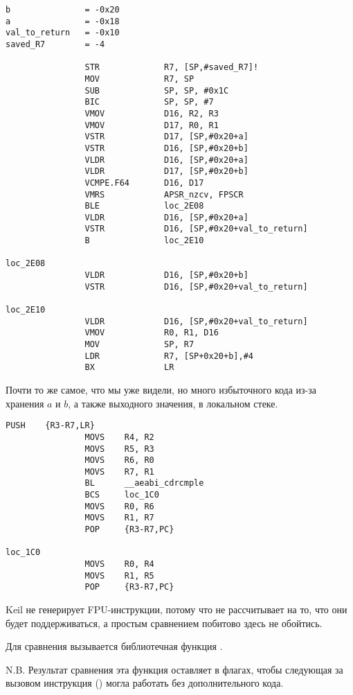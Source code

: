 \begin{lstlisting}[caption=\NonOptimizingXcodeIV (\ARMMode)]
b               = -0x20
a               = -0x18
val_to_return   = -0x10
saved_R7        = -4

                STR             R7, [SP,#saved_R7]!
                MOV             R7, SP
                SUB             SP, SP, #0x1C
                BIC             SP, SP, #7
                VMOV            D16, R2, R3
                VMOV            D17, R0, R1
                VSTR            D17, [SP,#0x20+a]
                VSTR            D16, [SP,#0x20+b]
                VLDR            D16, [SP,#0x20+a]
                VLDR            D17, [SP,#0x20+b]
                VCMPE.F64       D16, D17
                VMRS            APSR_nzcv, FPSCR
                BLE             loc_2E08
                VLDR            D16, [SP,#0x20+a]
                VSTR            D16, [SP,#0x20+val_to_return]
                B               loc_2E10

loc_2E08
                VLDR            D16, [SP,#0x20+b]
                VSTR            D16, [SP,#0x20+val_to_return]

loc_2E10
                VLDR            D16, [SP,#0x20+val_to_return]
                VMOV            R0, R1, D16
                MOV             SP, R7
                LDR             R7, [SP+0x20+b],#4
                BX              LR
\end{lstlisting}

Почти то же самое, что мы уже видели, 
но много избыточного кода из-за хранения $a$ и $b$, 
а также выходного значения, в локальном стеке.


\myparagraph{\OptimizingKeilVI (\ThumbMode)}

\begin{lstlisting}[caption=\OptimizingKeilVI (\ThumbMode)]
                PUSH    {R3-R7,LR}
                MOVS    R4, R2
                MOVS    R5, R3
                MOVS    R6, R0
                MOVS    R7, R1
                BL      __aeabi_cdrcmple
                BCS     loc_1C0
                MOVS    R0, R6
                MOVS    R1, R7
                POP     {R3-R7,PC}

loc_1C0
                MOVS    R0, R4
                MOVS    R1, R5
                POP     {R3-R7,PC}
\end{lstlisting}

Keil не генерирует FPU-инструкции, потому что не 
рассчитывает на то, что они будет поддерживаться, а простым сравнением побитово здесь не обойтись.

Для сравнения вызывается библиотечная функция . 

N.B. Результат сравнения эта функция оставляет в флагах, чтобы следующая за вызовом инструкция
 ()
могла работать без дополнительного кода.

